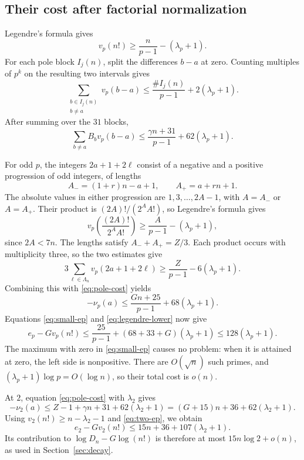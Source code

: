 \subsection{Their cost after factorial normalization}
Legendre's formula gives
\begin{equation}\label{eq:legendre-lower}
 v_p(n!)\ge\frac{n}{p-1}-(\lambda_p+1).
\end{equation}
For each pole block $I_j(n)$, split the differences $b-a$ at zero.
Counting multiples of $p^k$ on the resulting two intervals gives
\[
 \sum_{\substack{b\in I_j(n)\\b\ne a}}v_p(b-a)
 \le\frac{\#I_j(n)}{p-1}+2(\lambda_p+1).
\]
After summing over the $31$ blocks,
\begin{equation}\label{eq:pole-cost}
 \sum_{b\ne a}B_bv_p(b-a)
 \le\frac{\gamma n+31}{p-1}+62(\lambda_p+1).
\end{equation}

For odd $p$, the integers $2a+1+2\ell$ consist of a negative
and a positive progression of odd integers, of lengths
\[
 A_-=(1+r)n-a+1,\qquad A_+=a+rn+1.
\]
The absolute values in either progression are $1,3,\ldots,2A-1$,
with $A=A_-$ or $A=A_+$. Their product is $(2A)!/(2^AA!)$, so
Legendre's formula gives
\[
 v_p\left(\frac{(2A)!}{2^AA!}\right)
       \ge\frac{A}{p-1}-(\lambda_p+1),
\]
since $2A<7n$. The lengths satisfy $A_-+A_+=Z/3$. Each product
occurs with multiplicity three, so the two estimates give
\[
 3\sum_{\ell\in\Lambda_n}v_p(2a+1+2\ell)
       \ge\frac{Z}{p-1}-6(\lambda_p+1).
\]
Combining this with \eqref{eq:pole-cost} yields
\[
 -\nu_p(a)\le\frac{Gn+25}{p-1}+68(\lambda_p+1).
\]
Equations \eqref{eq:small-ep} and \eqref{eq:legendre-lower} now give
\[
 e_p-Gv_p(n!)
 \le\frac{25}{p-1}+(68+33+G)(\lambda_p+1)
 \le128(\lambda_p+1).
\]
The maximum with zero in \eqref{eq:small-ep} causes no problem:
when it is attained at zero, the left side is nonpositive.
There are $O(\sqrt n)$ such primes, and
$(\lambda_p+1)\log p=O(\log n)$, so their total cost is $o(n)$.

At $2$, equation \eqref{eq:pole-cost} with $\lambda_2$ gives
\[
 -\nu_2(a)\le Z-1+\gamma n+31+62(\lambda_2+1)
            =(G+15)n+36+62(\lambda_2+1).
\]
Using $v_2(n!)\ge n-\lambda_2-1$ and \eqref{eq:two-ep}, we obtain
\[
 e_2-Gv_2(n!)\le15n+36+107(\lambda_2+1).
\]
Its contribution to $\log D_n-G\log(n!)$ is therefore at most
$15n\log2+o(n)$, as used in Section~\ref{sec:decay}.
